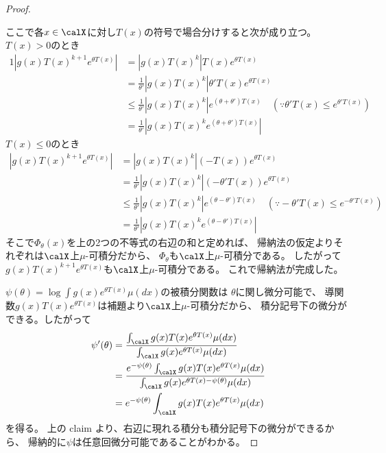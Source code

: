 \documentclass[report]{jlreq}
\begin{document}
\begin{proof}
\begin{innerproof}
        ここで各$x \in \calX$に対し$T(x)$の符号で場合分けすると次が成り立つ。
        $T(x) > 0$のとき
        \begin{alignat}{1}
            |g(x) T(x)^{k + 1} e^{\theta T(x)}|
                &= |g(x) T(x)^k| T(x) e^{\theta T(x)} \\
                &= \frac{1}{\theta'} |g(x) T(x)^k| \theta' T(x) e^{\theta T(x)} \\
                &\le \frac{1}{\theta'} |g(x) T(x)^k| e^{(\theta + \theta') T(x)}
                    \quad
                    (\because \theta' T(x) \le e^{\theta' T(x)}) \\
                &= \frac{1}{\theta'} |g(x) T(x)^k e^{(\theta + \theta') T(x)}|
        \end{alignat}
        $T(x) \le 0$のとき
        \begin{align}
            |g(x) T(x)^{k + 1} e^{\theta T(x)}|
                &= |g(x) T(x)^k| (- T(x)) e^{\theta T(x)} \\
                &= \frac{1}{\theta'} |g(x) T(x)^k| (- \theta' T(x)) e^{\theta T(x)} \\
                &\le \frac{1}{\theta'} |g(x) T(x)^k| e^{(\theta - \theta') T(x)}
                    \quad
                    (\because - \theta' T(x) \le e^{- \theta' T(x)}) \\
                &= \frac{1}{\theta'} |g(x) T(x)^k e^{(\theta - \theta') T(x)}|
        \end{align}
        そこで$\Phi_\theta(x)$を上の2つの不等式の右辺の和と定めれば、
        帰納法の仮定よりそれぞれは$\calX$上$\mu$-可積分だから、
        $\Phi_\theta$も$\calX$上$\mu$-可積分である。
        したがって$g(x) T(x)^{k + 1} e^{\theta T(x)}$も$\calX$上$\mu$-可積分である。
        これで帰納法が完成した。
    \end{innerproof}
    $\psi(\theta) = \log \int g(x) e^{\theta T(x)} \mu(dx)$の被積分関数は
    $\theta$に関し微分可能で、
    導関数$g(x) T(x) e^{\theta T(x)}$は補題より$\calX$上$\mu$-可積分だから、
    積分記号下の微分ができる。したがって
    \begin{alignat}{1}
        \psi'(\theta)
            &= \frac{\int_\calX g(x) T(x) e^{\theta T(x)} \mu(dx)}
                {\int_\calX g(x) e^{\theta T(x)} \mu(dx)} \\
            &= \frac{e^{-\psi(\theta)} \int_\calX g(x) T(x) e^{\theta T(x)} \mu(dx)}
                {\int_\calX g(x) e^{\theta T(x) - \psi(\theta)} \mu(dx)} \\
            &= e^{-\psi(\theta)} \int_\calX g(x) T(x) e^{\theta T(x)} \mu(dx)
    \end{alignat}
    を得る。
    上の claim より、右辺に現れる積分も積分記号下の微分ができるから、
    帰納的に$\psi$は任意回微分可能であることがわかる。
\end{proof}
\end{document}
